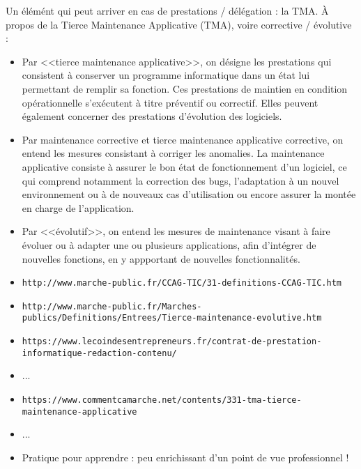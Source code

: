 \documentclass[11pt,twoside,a4paper]{article}
\begin{document}
\begin{landscape}
\begin{multicols}{2}
	Un {\'e}l{\'e}m{\'e}nt qui peut arriver en cas de prestations / d{\'e}l{\'e}gation : la TMA. {\`A} propos de la Tierce Maintenance Applicative (TMA), voire corrective / {\'e}volutive :~\\
	\begin{itemize}
		\item Par <<tierce maintenance applicative>>, on d{\'e}signe les prestations qui consistent {\`a} conserver un programme informatique dans un {\'e}tat lui permettant de remplir sa fonction. Ces prestations de maintien en condition op{\'e}rationnelle s’ex{\'e}cutent {\`a} titre pr{\'e}ventif ou correctif. Elles peuvent {\'e}galement concerner des prestations d’{\'e}volution des logiciels.
		\item Par maintenance corrective et tierce maintenance applicative corrective, on entend les mesures consistant {\`a} corriger les anomalies. La maintenance applicative consiste {\`a} assurer le bon {\'e}tat de fonctionnement d'un logiciel, ce qui comprend notamment la correction des bugs, l'adaptation {\`a} un nouvel environnement ou {\`a} de nouveaux cas d'utilisation ou encore assurer la mont{\'e}e en charge de l'application. 
		\item Par <<{\'e}volutif>>, on entend les mesures de maintenance visant {\`a} faire {\'e}voluer ou {\`a} adapter une ou plusieurs applications, afin d’int{\'e}grer de nouvelles fonctions, en y appportant de nouvelles fonctionnalit{\'e}s.
		\item \texttt{http://www.marche-public.fr/CCAG-TIC/31-definitions-CCAG-TIC.htm}
		\item \texttt{http://www.marche-public.fr/Marches-publics/Definitions/Entrees/Tierce-maintenance-evolutive.htm}
		\item \texttt{https://www.lecoindesentrepreneurs.fr/contrat-de-prestation-informatique-redaction-contenu/}
		\item ... 
		\item \texttt{https://www.commentcamarche.net/contents/331-tma-tierce-maintenance-applicative}
		\item ... 
		\item Pratique pour apprendre : peu enrichissant d'un point de vue professionnel !
	\end{itemize}
\end{multicols}

\clearpage

\end{landscape}
\end{document}
